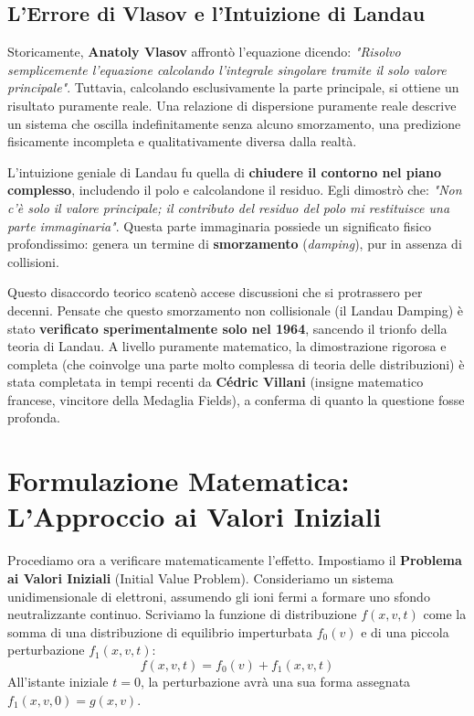 \subsection{L'Errore di Vlasov e l'Intuizione di Landau}
Storicamente, \textbf{Anatoly Vlasov} affrontò l'equazione dicendo: \textit{"Risolvo semplicemente l'equazione calcolando l'integrale singolare tramite il solo valore principale"}.
Tuttavia, calcolando esclusivamente la parte principale, si ottiene un risultato puramente reale. Una relazione di dispersione puramente reale descrive un sistema che oscilla indefinitamente senza alcuno smorzamento, una predizione fisicamente incompleta e qualitativamente diversa dalla realtà.

L'intuizione geniale di Landau fu quella di \textbf{chiudere il contorno nel piano complesso}, includendo il polo e calcolandone il residuo. Egli dimostrò che: \textit{"Non c'è solo il valore principale; il contributo del residuo del polo mi restituisce una parte immaginaria"}.
Questa parte immaginaria possiede un significato fisico profondissimo: genera un termine di \textbf{smorzamento} (\textit{damping}), pur in assenza di collisioni.

Questo disaccordo teorico scatenò accese discussioni che si protrassero per decenni. Pensate che questo smorzamento non collisionale (il Landau Damping) è stato \textbf{verificato sperimentalmente solo nel 1964}, sancendo il trionfo della teoria di Landau. A livello puramente matematico, la dimostrazione rigorosa e completa (che coinvolge una parte molto complessa di teoria delle distribuzioni) è stata completata in tempi recenti da \textbf{Cédric Villani} (insigne matematico francese, vincitore della Medaglia Fields), a conferma di quanto la questione fosse profonda.

\section{Formulazione Matematica: L'Approccio ai Valori Iniziali}

Procediamo ora a verificare matematicamente l'effetto. Impostiamo il \textbf{Problema ai Valori Iniziali} (Initial Value Problem).
Consideriamo un sistema unidimensionale di elettroni, assumendo gli ioni fermi a formare uno sfondo neutralizzante continuo. Scriviamo la funzione di distribuzione $f(x,v,t)$ come la somma di una distribuzione di equilibrio imperturbata $f_0(v)$ e di una piccola perturbazione $f_1(x,v,t)$:
\begin{equation}
f(x,v,t) = f_0(v) + f_1(x,v,t)
\end{equation}
All'istante iniziale $t=0$, la perturbazione avrà una sua forma assegnata $f_1(x,v,0) = g(x,v)$.

